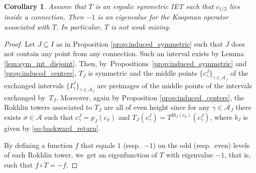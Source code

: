 \documentclass[10pt,a4paper]{article}
\providecommand{\resp}{resp.\ }
\theoremstyle{plain}
\newtheorem{corollary}[theorem]{Corollary}
\theoremstyle{definition}
\newcommand{\A}{\mathcal{A}}
\begin{document}
\begin{corollary}\label{cor: evalue-1}
Assume that $T$ is an ergodic symmetric IET such that $c_{1/2}$ lies inside a connection. Then $-1$ is an eigenvalue for the Koopman operator associated with $T$. In particular, $T$ is not weak mixing.
\end{corollary}

\begin{proof}
Let $J \subseteq I$ as in Proposition \ref{prop:induced_symmetric} such that $J$ does not contain any point from any connection. Such an interval exists by Lemma \ref{lem:sym_int_disjoint}. Then, by~Propo\-si\-tions~\ref{prop:induced_symmetric} and \ref{prop:induced_centers}, $T_J$ is symmetric and the middle points $\{c_\gamma^J\}_{\gamma \in \A_J}$ of the exchanged intervals $\{I_\gamma^J\}_{\gamma \in \A_J}$ are preimages of the middle points of the intervals exchanged by~$T_J$.
Moreover, again by Proposition \ref{prop:induced_centers}, the Rokhlin towers associated to $T_J$ are all of even height since for any $\gamma \in \A_J$ there exists $\sigma \in \A$ such that $c_\gamma^J = p_J(c_\sigma)$ and $T_J(c_\gamma^J) = T^{2b_J(c_\sigma)}(c_\gamma^J)$, where $b_J$ is given by \eqref{eq:backward_return}.

By defining a function $f$ that equals $1$ (\resp $-1$) on the odd (\resp even) levels of each Rokhlin tower, we~get an eigenfunction of $T$ with eigenvalue $-1$, that is, such that $f \circ T = -f$.
\end{proof}
\end{document}
